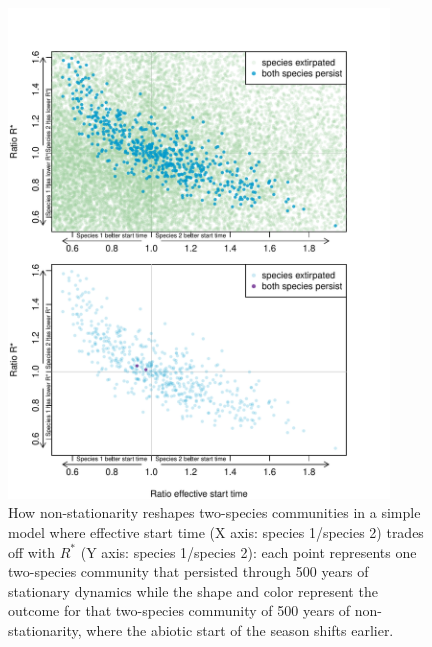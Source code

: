 \documentclass[11pt,letterpaper]{article}
\begin{document}
\begin{figure}[t!]
\centering
\includegraphics[width=0.9\textwidth]{..//..//R/graphs/modelruns/manuscript/tauIPrstart1_2panel.pdf}
\caption{How non-stationarity reshapes two-species communities in a simple model where effective start time (X axis: species 1/species 2) trades off with $R^*$ (Y axis: species 1/species 2): each point represents one two-species community that persisted through 500 years of stationary dynamics while the shape and color represent the outcome for that two-species community of 500 years of non-stationarity, where the abiotic start of the season shifts earlier.}
 \label{fig:tauirstar}
\end{figure}
\end{document}
